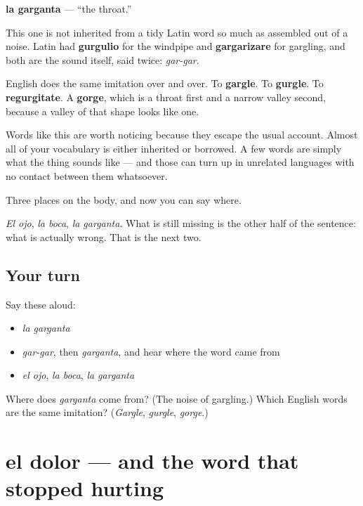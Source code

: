 \begin{cousinweb}
\textbf{la garganta} — \textquotedblleft{}the throat.\textquotedblright{}

This one is not inherited from a tidy Latin word so much as assembled out of a noise. Latin had \textbf{gurgulio} for the windpipe and \textbf{gargarizare} for gargling, and both are the sound itself, said twice: \emph{gar-gar}.

English does the same imitation over and over. To \textbf{gargle}. To \textbf{gurgle}. To \textbf{regurgitate}. A \textbf{gorge}, which is a throat first and a narrow valley second, because a valley of that shape looks like one.

Words like this are worth noticing because they escape the usual account. Almost all of your vocabulary is either inherited or borrowed. A few words are simply what the thing sounds like — and those can turn up in unrelated languages with no contact between them whatsoever.
\end{cousinweb}

\begin{grammarlens}[title={What you've built}]
Three places on the body, and now you can say where.

\emph{El ojo}, \emph{la boca}, \emph{la garganta}. What is still missing is the other half of the sentence: what is actually wrong. That is the next two.
\end{grammarlens}

\subsection*{Your turn}
Say these aloud:

\begin{itemize}
\raggedright
  \item \emph{la garganta}
  \item \emph{gar-gar}, then \emph{garganta}, and hear where the word came from
  \item \emph{el ojo}, \emph{la boca}, \emph{la garganta}
\end{itemize}

\begin{tcolorbox}[breakable,colback=teal!4,colframe=teal!35!black,title={Before you move on}]
Where does \emph{garganta} come from? (The noise of gargling.) Which English words are the same imitation? (\emph{Gargle}, \emph{gurgle}, \emph{gorge}.)
\end{tcolorbox}
\section[el dolor]{el dolor — and the word that stopped hurting}


